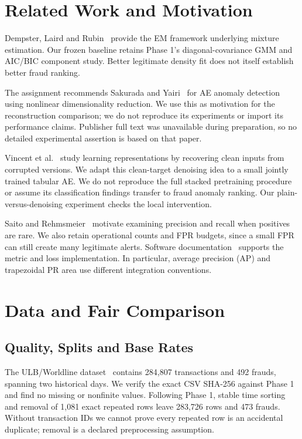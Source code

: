 \documentclass[conference]{IEEEtran}
\begin{document}
\section{Related Work and Motivation}
Dempster, Laird and Rubin~\cite{em} provide the EM framework underlying mixture estimation. Our frozen baseline retains Phase 1's diagonal-covariance GMM and AIC/BIC component study. Better legitimate density fit does not itself establish better fraud ranking.

The assignment recommends Sakurada and Yairi~\cite{sakurada} for AE anomaly detection using nonlinear dimensionality reduction. We use this as motivation for the reconstruction comparison; we do not reproduce its experiments or import its performance claims. Publisher full text was unavailable during preparation, so no detailed experimental assertion is based on that paper.

Vincent et al.~\cite{vincent} study learning representations by recovering clean inputs from corrupted versions. We adapt this clean-target denoising idea to a small jointly trained tabular AE. We do not reproduce the full stacked pretraining procedure or assume its classification findings transfer to fraud anomaly ranking. Our plain-versus-denoising experiment checks the local intervention.

Saito and Rehmsmeier~\cite{pr} motivate examining precision and recall when positives are rare. We also retain operational counts and FPR budgets, since a small FPR can still create many legitimate alerts. Software documentation~\cite{sk,torch} supports the metric and loss implementation. In particular, average precision (AP) and trapezoidal PR area use different integration conventions.

\section{Data and Fair Comparison}
\subsection{Quality, Splits and Base Rates}
The ULB/Worldline dataset~\cite{data} contains 284,807 transactions and 492 frauds, spanning two historical days. We verify the exact CSV SHA-256 against Phase 1 and find no missing or nonfinite values. Following Phase 1, stable time sorting and removal of 1,081 exact repeated rows leave 283,726 rows and 473 frauds. Without transaction IDs we cannot prove every repeated row is an accidental duplicate; removal is a declared preprocessing assumption.
\end{document}
